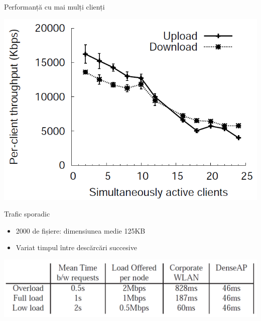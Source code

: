 \begin{frame}{Performanță cu mai mulți clienți}
  \begin{center}
    \includegraphics[scale=0.35]{img/fig17.png}
  \end{center}
\end{frame}

\begin{frame}{Trafic sporadic}
  \begin{itemize}
    \item 2000 de fișiere: dimensiunea medie 125KB
    \item Variat timpul între descărcări succesive
  \end{itemize}
  \begin{center}
    \includegraphics[scale=0.2]{img/table1.png}
  \end{center}
\end{frame}

